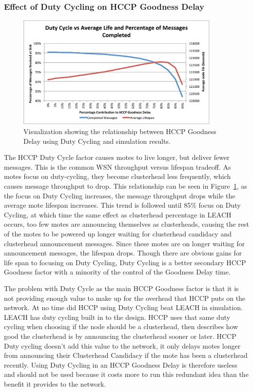 \subsubsection{Effect of Duty Cycling on HCCP Goodness Delay}

\begin{figure}[htbp]
	\centering
		\includegraphics[width=0.9\textwidth]{images/simulation/goodness/Duty2.pdf}
	\caption{Visualization showing the relationship between HCCP Goodness Delay using Duty Cycling and simulation results.}
	\label{fig:images_simulation_goodness_Duty}
\end{figure}

The HCCP Duty Cycle factor causes motes to live longer, but deliver fewer messages. This is the
common WSN throughput versus lifespan tradeoff. As motes focus on duty-cycling, they 
become clusterhead less frequently, which causes message throughput to drop. This 
relationship can be seen in Figure~\ref{fig:images_simulation_goodness_Duty}, as 
the focus on Duty Cycling increases, the message throughput drops while the average mote lifespan 
increases. This trend is followed until 85\% focus on Duty Cycling, at which time the same effect as 
clusterhead percentage in LEACH occurs, too few motes are announcing themselves as clusterheads, causing 
the rest of the motes to be powered up longer waiting for clusterhead candidacy and clusterhead announcement messages.
Since these motes are on longer waiting for announcement messages, the lifespan drops. Though there are obvious 
gains for life span to focusing on Duty Cycling, Duty Cycling is a better secondary HCCP Goodness factor with a 
minority of the control of the Goodness Delay time.

The problem with Duty Cycle as the main HCCP Goodness factor is that it is not 
providing enough value to make up for the overhead that HCCP puts on the network.
At no time did HCCP using Duty Cycling beat LEACH in simulation. LEACH
has duty cycling built in to the design. HCCP uses that same duty cycling when 
choosing if the node should be a clusterhead, then describes how good the
clusterhead is by announcing the clusterhead sooner or later. HCCP Duty cycling doesn't 
add this value to the network, it only delays motes longer from announcing their Clusterhead
Candidacy if the mote has been a clusterhead recently. Using Duty Cycling in an HCCP 
Goodness Delay is therefore useless and should not be used because it costs more to run this
redundant idea than the benefit it provides to the network.




